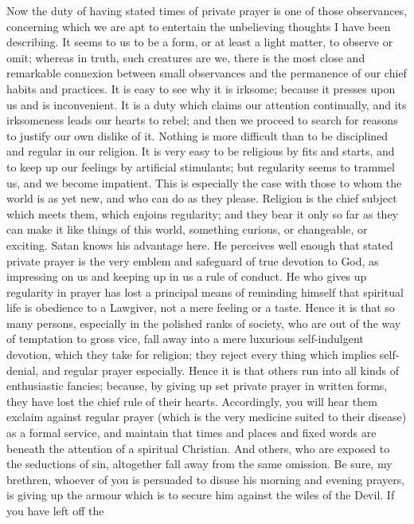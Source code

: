 Now the duty of having stated times of private prayer
is one of those observances, concerning which we are apt
to entertain the unbelieving thoughts I have been
describing. It seems to us to be a form, or at least a
light matter, to observe or omit; whereas in truth, such
creatures are we, there is the most close and remarkable
connexion between small observances and the permanence of
our chief habits and practices. It is easy to see why it
is irksome; because it presses upon us and is
inconvenient. It is a duty which claims our attention
continually, and its irksomeness leads our hearts to
rebel; and then we proceed to search for reasons to
justify our own dislike of it. Nothing is more difficult
than to be disciplined and regular in our religion. It is
very easy to be religious by fits and starts, and to keep
up our feelings by artificial stimulants; but regularity
seems to trammel us, and we become impatient. This is
especially the case with those to whom the world is as
yet new, and who can do as they please. Religion is the
chief subject which meets them, which enjoins regularity;
and they bear it only so far as they can make it like
things of this world, something curious, or changeable,
or exciting. Satan knows his advantage here. He perceives
well enough that stated private prayer is the very emblem
and safeguard of true devotion to God, as impressing on
us and keeping up in us a rule of conduct. He who gives
up regularity in prayer has lost a principal means of
reminding himself that spiritual life is obedience to a
Lawgiver, not a mere feeling or a taste. Hence it is that
so many persons, especially in the polished ranks of
society, who are out of the way of temptation to gross
vice, fall away into a mere luxurious self-indulgent
devotion, which they take for religion; they reject every
thing which implies self-denial, and regular prayer
especially. Hence it is that others run into all kinds of
enthusiastic fancies; because, by giving up set private
prayer in written forms, they have lost the chief rule of
their hearts. Accordingly, you will hear them exclaim
against regular prayer (which is the very medicine suited
to their disease) as a formal service, and maintain that
times and places and fixed words are beneath the
attention of a spiritual Christian. And others, who are
exposed to the seductions of sin, altogether fall away
from the same omission. Be sure, my brethren, whoever of
you is persuaded to disuse his morning and evening
prayers, is giving up the armour which is to secure him
against the wiles of the Devil. If you have left off the
